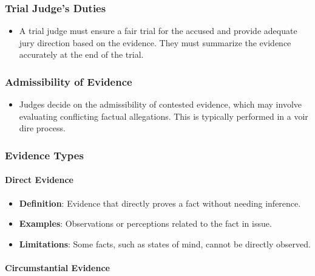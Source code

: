 \subsubsection{Trial Judge's Duties}\label{trial-judges-duties}

\begin{itemize}
\tightlist
\item
  A trial judge must ensure a fair trial for the accused and provide
  adequate jury direction based on the evidence. They must summarize the
  evidence accurately at the end of the trial.
\end{itemize}

\subsubsection{Admissibility of
Evidence}\label{admissibility-of-evidence}

\begin{itemize}
\tightlist
\item
  Judges decide on the admissibility of contested evidence, which may
  involve evaluating conflicting factual allegations. This is typically
  performed in a voir dire process.
\end{itemize}

\subsubsection{Evidence Types}\label{evidence-types}

\paragraph{Direct Evidence}\label{direct-evidence}

\begin{itemize}
\tightlist
\item
  \textbf{Definition}: Evidence that directly proves a fact without
  needing inference.
\item
  \textbf{Examples}: Observations or perceptions related to the fact in
  issue.
\item
  \textbf{Limitations}: Some facts, such as states of mind, cannot be
  directly observed.
\end{itemize}

\paragraph{Circumstantial Evidence}\label{circumstantial-evidence}

